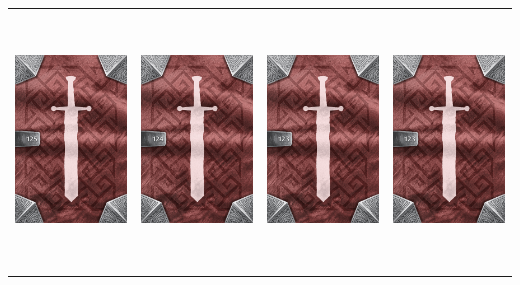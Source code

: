 \documentclass{minimal}
\begin{document}
{\begin{longtable}{llll}
\includegraphics[width=44mm,height=68mm]{./64-151/gh-125-curious-gear-back.png} &
\includegraphics[width=44mm,height=68mm]{./64-151/gh-124-doomed-compass-back.png} &
\includegraphics[width=44mm,height=68mm]{./64-151/gh-123-ring-of-skulls-back.png} &
\includegraphics[width=44mm,height=68mm]{./64-151/gh-123-ring-of-skulls-back.png}\\ 

\end{longtable}}
\end{document}
